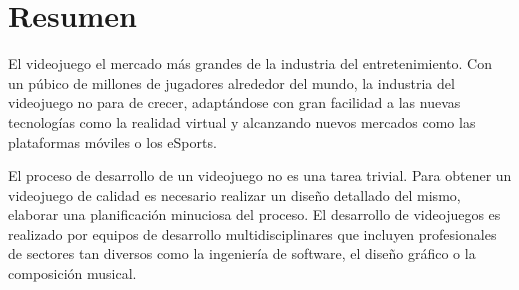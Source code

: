 \chapter{Resumen}
El videojuego el mercado más grandes de la industria del entretenimiento. Con un púbico de millones de jugadores alrededor del mundo, la industria del videojuego no para de crecer, adaptándose con gran facilidad a las nuevas tecnologías como la realidad virtual y alcanzando nuevos mercados como las plataformas móviles o los eSports.

El proceso de desarrollo de un videojuego no es una tarea trivial. Para obtener un videojuego de calidad es necesario realizar un diseño detallado del mismo, elaborar una planificación minuciosa del proceso. El desarrollo de videojuegos es realizado por equipos de desarrollo multidisciplinares que incluyen profesionales de sectores tan diversos como la ingeniería de software, el diseño gráfico o la composición musical. 
